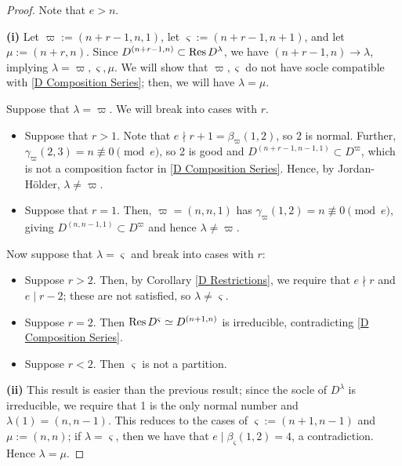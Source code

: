 \documentclass{amsart}
\begin{document}
  \begin{proof}
    Note that $e > n$.

    \textbf{(i)}
    Let $\varpi := (n+r-1,n,1)$, let $\varsigma := (n+r-1,n+1)$, and let $\mu := (n + r,n)$.
    Since $D^{(n+r-1,n)} \subset \text{Res} \, D^\lambda$, we have $(n + r - 1,n) \longrightarrow \lambda$, implying $\lambda = \varpi,\varsigma,\mu$.
    We will show that $\varpi, \varsigma$ do not have socle compatible with \eqref{D Composition Series};
    then, we will have $\lambda = \mu$.
    
    Suppose that $\lambda = \varpi$.
    We will break into cases with $r$.
    \begin{itemize}
      \item Suppose that $r > 1$.
        Note that $e \nmid r + 1 = \beta_\varpi(1,2)$, so $2$ is normal.
        Further, $\gamma_\varpi(2,3) = n \not\equiv 0 \pmod e$, so 2 is good and $D^{(n+r-1,n-1,1)} \subset D^\varpi$, which is not a composition factor in \eqref{D Composition Series}.
        Hence, by Jordan-H\"older, $\lambda \neq \varpi$.\cite{Etingof}

      \item Suppose that $r = 1$.
        Then, $\varpi = (n,n,1)$ has $\gamma_{\varpi}(1,2) = n \not\equiv 0 \pmod e$, giving $D^{(n,n-1,1)} \subset D^\varpi$ and hence $\lambda \neq \varpi$.
    \end{itemize} 
  \iffalse %
   \begin{align*}
    \beta_{\varpi}(1,2)     &= r + 1 \\
    \beta_{\varpi}(1,3)     &= n + r + 1 \\
    \beta_{\varpi}(2,3)     &= n + 1\\
    \gamma_{\varpi}(1,2)    &= r\\
    \gamma_{\varpi}(1,3)    &= n + r\\
    \gamma_{\varpi}(2,3)    &= n\\
  \end{align*}
  \fi

  \vspace{5pt}
  Now suppose that $\lambda = \varsigma$ and break into cases with $r$:
  \begin{itemize}
    \item Suppose $r > 2$.
      Then, by Corollary \ref{D Restrictions}, we require that $e \nmid r$ and $e \mid r - 2$;
      these are not satisfied, so $\lambda \neq \varsigma$.
    \item Suppose $r = 2$.
      Then $\text{Res} \, D^\varsigma \simeq D^{(n+1,n)}$ is irreducible, contradicting \eqref{D Composition Series}. 
    \item Suppose $r < 2$. 
      Then $\varsigma$ is not a partition.
  \end{itemize}

  \textbf{(ii)}
  This result is easier than the previous result;
  since the socle of $D^\lambda$ is irreducible, we require that 1 is the only normal number and $\lambda(1) = (n,n-1)$.
  This reduces to the cases of $\varsigma := (n + 1, n - 1)$ and $\mu := (n,n)$;
  if $\lambda = \varsigma$, then we have that $e \mid \beta_\varsigma(1,2) = 4$, a contradiction.
  Hence $\lambda = \mu$.
\end{proof}
\end{document}
